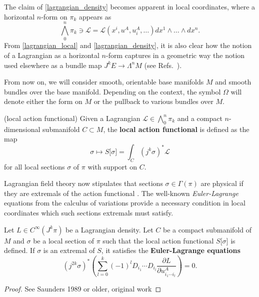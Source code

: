 The claim of \eqref{lagrangian_density} becomes apparent in local coordinates, where a horizontal $n$-form on $\pi_k$ appears as
\begin{equation}\label{lagrangian_local}
  \textstyle\bigwedge^n_0\pi_k\ni \mathcal L = \mathcal L(x^i,u^A,u^A_i,\dots) dx^1\wedge \dots \wedge dx^n.
\end{equation}
From \eqref{lagrangian_local} and \eqref{lagrangian_density}, it is also clear how the notion of a Lagrangian as a horizontal $n$-form captures in a geometric way the notion used elsewhere as a bundle map $J^kE \rightarrow \Lambda^nM$ (see Refs.~\cite{saunders,marsden,ccg}).


From now on, we will consider smooth, orientable base manifolds $M$ and smooth bundles over the base manifold. Depending on the context, the symbol $\Omega$ will denote either the form on $M$ or the pullback to various bundles over $M$.

\begin{definition}{(local action functional)}
  Given a Lagrangian $\mathcal L \in \bigwedge^n_0\pi_k$ and a compact $n$-dimensional submanifold $C \subset M$, the \textbf{local action functional} is defined as the map
  \begin{equation}
    \sigma \mapsto S\lbrack\sigma\rbrack = \int_C (j^k\sigma)^\ast\mathcal L
  \end{equation}
for all local sections $\sigma$ of $\pi$ with support on $C$.
\end{definition}

Lagrangian field theory now stipulates that sections $\sigma\in\Gamma(\pi)$ are physical if they are extremals of the action functional \cite{}. The well-known \emph{Euler-Lagrange} equations from the calculus of variations provide a necessary condition in local coordinates which such sections extremals must satisfy.
\begin{proposition}
  Let $L\in C^\infty(J^k\pi)$ be a Lagrangian density. Let $C$ be a compact submanifold of $M$ and $\sigma$ be a local section of $\pi$ such that the local action functional $S\lbrack\sigma\rbrack$ is defined. If $\sigma$ is an extremal of $S$, it satisfies the \textbf{Euler-Lagrange equations}
  \begin{equation}\label{euler_lagrange_local}
    (j^{2k}\sigma)^\ast\left( \sum_{l=0}^{k} (-1)^l D_{i_1} \cdots D_{i_l} \frac{\partial L}{\partial u^A_{i_1\cdots i_l}}\right) = 0.
  \end{equation}
\end{proposition}
\begin{proof}
  See Saunders 1989 or older, original work
\end{proof}

